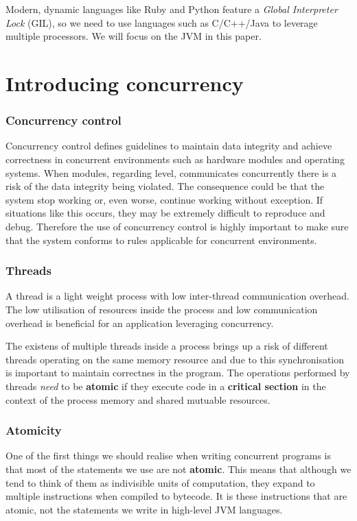 \documentclass[a4paper,12pt]{kth-mag}
\begin{document}
Modern, dynamic languages like Ruby and Python feature a \textit{Global Interpreter Lock} (GIL), so we need to use languages such as C/C++/Java to leverage multiple processors. We will focus on the JVM in this paper.

\part{Introducing concurrency}

\section{Concurrency control} \label{sec:con_con}
Concurrency control defines guidelines to maintain data integrity and achieve correctness in concurrent environments such as hardware modules and operating systems\cite{concon}. When modules, regarding level, communicates concurrently there is a risk of the data integrity being violated. The consequence could be that the system stop working or, even worse, continue working without exception. If situations like this occurs, they may be extremely difficult to reproduce and debug. Therefore the use of concurrency control is highly important to make sure that the system conforms to rules applicable for concurrent environments.

\section{Threads}
A thread is a light weight process with low inter-thread communication overhead. The low utilisation of resources inside the process and low communication overhead is beneficial for an application leveraging concurrency. 

The existens of multiple threads inside a process brings up a risk of different threads operating on the same memory resource and due to this synchronisation is important to maintain correctnes in the program. The operations performed by threads \textit{need} to be \textbf{atomic} if they execute code in a \textbf{critical section} in the context of the process memory and shared mutuable resources.

\section{Atomicity}

One of the first things we should realise when writing concurrent programs is that most of the statements we use are not \textbf{atomic}. This means that although we tend to think of them as indivisible units of computation, they expand to multiple instructions when compiled to bytecode. It is these instructions that are atomic, not the statements we write in high-level JVM languages.
\end{document}
